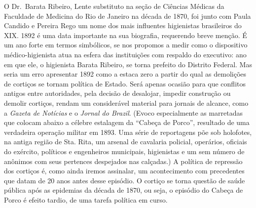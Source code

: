 O Dr.~Barata Ribeiro, Lente substituto na seção de Ciências Médicas da
Faculdade de Medicina do Rio de Janeiro na década de 1870, foi junto com
Paula Candido e Pereira Rego um nome dos mais influentes higienistas
brasileiros do XIX. 1892 é uma data importante na sua biografia,
requerendo breve menção. É um ano forte em termos simbólicos, se nos
propomos a medir como o dispositivo médico-higienista atua na esfera das
instituições com respaldo do executivo: ano em que ele, o higienista
Barata Ribeiro, se torna prefeito do Distrito Federal. Mas seria um erro
apresentar 1892 como a estaca zero a partir do qual as demolições de
cortiços se tornam política de Estado. Será apenas ocasião para que
conflitos antigos entre autoridades, pela decisão de desalojar, impedir
construção ou demolir cortiços, rendam um considerável material para
jornais de alcance, como a \emph{Gazeta de Notícias} e o \emph{Jornal do
Brazil}. (Evoco especialmente as marretadas que colocam abaixo a célebre
estalagem da ``Cabeça de Porco'', resultado de uma verdadeira operação
militar em 1893. Uma série de reportagens põe sob holofotes, na antiga
região de Sta. Rita, um arsenal de cavalaria policial, operários,
oficiais do exército, políticos e engenheiros municipais, higienistas e
um sem número de anônimos com seus pertences despejados nas calçadas.) A
política de repressão dos cortiços é, como ainda iremos assinalar, um
acontecimento com precedentes que datam de 20 anos antes desse episódio.
O cortiço se torna questão de saúde pública após as epidemias da década
de 1870, ou seja, o episódio do Cabeça de Porco é efeito tardio, de uma
tarefa política em curso.

